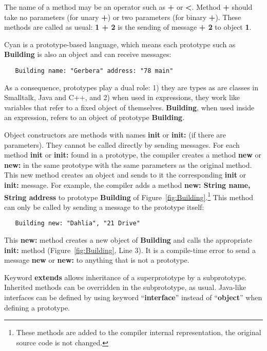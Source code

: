 \documentclass[preprint,review]{elsarticle}
\newcommand{\srcstyle}[1]{\ttfamily\textbf{#1}\rmfamily}
\begin{document}
The name of a method may be an operator such as \srcstyle{+} or \srcstyle{<}. Method \srcstyle{+} should take no parameters (for unary \srcstyle{+}) or two parameters (for binary \srcstyle{+}). These methods are called as usual:  \srcstyle{1 + 2} is the sending of message \srcstyle{+ 2} to object \srcstyle{1}.

Cyan is a prototype-based language, which means each prototype such as \srcstyle{Building} is also an object and can receive messages:
\begin{verbatim}
   Building name: "Gerbera" address: "78 main"
\end{verbatim}
As a consequence, prototypes play a dual role: 1) they are types as are
classes in Smalltalk, Java and C++, and 2) when used in expressions, they work like variables that refer to a fixed object of themselves.  \srcstyle{Building}, when used inside an expression, refers to an object of prototype \srcstyle{Building}.


Object constructors are methods  with names \srcstyle{init} or \srcstyle{init:} (if there are parameters). They
cannot  be called  directly  by sending  messages.
For  each  method  \srcstyle{init}  or  \srcstyle{init:}  found  in  a
prototype,   the   compiler   creates  a   method   \srcstyle{new}   or
\srcstyle{new:} in the same prototype  with the same parameters as the
original method.   This new method creates  an object and sends  to it
the  corresponding \srcstyle{init}  or \srcstyle{init:}  message.  For
example, the compiler adds a method \srcstyle{new: String name, String
  address}       to       prototype       \srcstyle{Building}       of
Figure~\ref{fig:Building}.\footnote{These  methods  are added  to  the
  compiler internal  representation, the  original source code  is not
  changed.} This method can only be called by sending a message to the
prototype itself:
\begin{verbatim}
   Building new: "Dahlia", "21 Drive"
\end{verbatim}
This    \srcstyle{new:}   method    creates    a    new   object    of
\srcstyle{Building} and calls  the appropriate \srcstyle{init:} method
(Figure~\ref{fig:Building}, Line  3).  It  is a compile-time  error to
send a message  \srcstyle{new} or \srcstyle{new:} to  anything that is
not a prototype.

Keyword \srcstyle{extends}  allows inheritance of a superprototype by a subprototype. Inherited methods can be overridden in the subprototype, as usual. Java-like interfaces can be defined by using keyword ``\srcstyle{interface}'' instead of ``\srcstyle{object}'' when defining a prototype.
\end{document}
